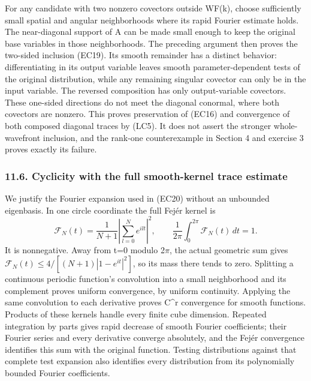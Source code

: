 \documentclass[
  11pt,
]{article}
\begin{document}
For any candidate with two nonzero covectors outside WF(k), choose
sufficiently small spatial and angular neighborhoods where its rapid
Fourier estimate holds. The near-diagonal support of A can be made small
enough to keep the original base variables in those neighborhoods. The
preceding argument then proves the two-sided inclusion (EC19). Its
smooth remainder has a distinct behavior: differentiating in its output
variable leaves smooth parameter-dependent tests of the original
distribution, while any remaining singular covector can only be in the
input variable. The reversed composition has only output-variable
covectors. These one-sided directions do not meet the diagonal conormal,
where both covectors are nonzero. This proves preservation of (EC16) and
convergence of both composed diagonal traces by (LC5). It does not
assert the stronger whole-wavefront inclusion, and the rank-one
counterexample in Section 4 and exercise 3 proves exactly its failure.

\subsubsection{11.6. Cyclicity with the full smooth-kernel trace
estimate}\label{cyclicity-with-the-full-smooth-kernel-trace-estimate}

We justify the Fourier expansion used in (EC20) without an unbounded
eigenbasis. In one circle coordinate the full Fejér kernel is \[
\mathcal F_N(t)=\frac1{N+1}\left|\sum_{l=0}^Ne^{ilt}\right|^2,
\qquad \frac1{2\pi}\int_0^{2\pi}\mathcal F_N(t)\,dt=1.
\tag{LC8}
\] It is nonnegative. Away from t=0 modulo 2\ensuremath{\pi}, the actual geometric sum
gives \(\mathcal F_N(t)\leq4/[(N+1)|1-e^{it}|^2]\), so its mass there
tends to zero. Splitting a continuous periodic function's convolution
into a small neighborhood and its complement proves uniform convergence,
by uniform continuity. Applying the same convolution to each derivative
proves C\^{}r convergence for smooth functions. Products of these
kernels handle every finite cube dimension. Repeated integration by
parts gives rapid decrease of smooth Fourier coefficients; their Fourier
series and every derivative converge absolutely, and the Fejér
convergence identifies this sum with the original function. Testing
distributions against that complete test expansion also identifies every
distribution from its polynomially bounded Fourier coefficients.
\end{document}
